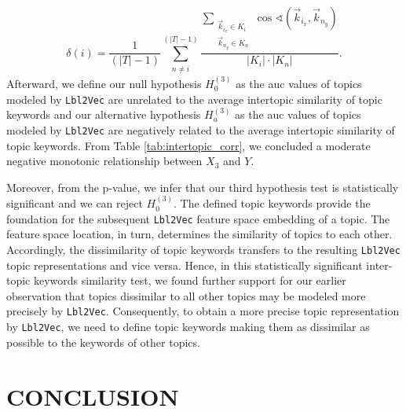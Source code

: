 \documentclass[a4paper,twoside]{article}
\begin{document}
\begin{equation}
    \delta(i)=\frac{1}{(|T|-1)}\sum_{\substack{n\neq i}}^{(|T|-1)} \frac{\sum\limits_{\substack{\vec{k}_{{i}_x}\in K_{i} \\ \vec{k}_{n_{y}}\in K_{n}}}\cos\sphericalangle(\vec{k}_{{i}_x},\vec{k}_{{n}_y})}{|K_{i}|\cdot|K_{n}|}.
\end{equation}
Afterward, we define our null hypothesis $H_{0}^{(3)}$ as the \ac{auc} values of topics modeled by \texttt{Lbl2Vec} are unrelated to the average intertopic similarity of topic keywords and our alternative hypothesis $H_{a}^{(3)}$ as the \ac{auc} values of topics modeled by \texttt{Lbl2Vec} are negatively related to the average intertopic similarity of topic keywords. From Table \ref{tab:intertopic_corr}, we concluded a moderate negative monotonic relationship between ${X_3}$ and $Y$.
\begin{table}[ht]
\centering
{}\caption{\label{tab:intertopic_corr} Correlation values that measure the relationship between ${X_3=}$ average intertopic similarity of topic keywords and ${Y=\textrm{\ac{auc}}}$ value of a topic. $X_{3_{min}}=0.07$ and $X_{3_{max}}=0.11$.}
\end{table}
Moreover, from the p-value, we infer that our third hypothesis test is statistically significant and we can reject $H_{0}^{(3)}$. The defined topic keywords provide the foundation for the subsequent \texttt{Lbl2Vec} feature space embedding of a topic. The feature space location, in turn, determines the similarity of topics to each other. Accordingly, the dissimilarity of topic keywords transfers to the resulting \texttt{Lbl2Vec} topic representations and vice versa. Hence, in this statistically significant inter-topic keywords similarity test, we found further support for our earlier observation that topics dissimilar to all other topics may be modeled more precisely by \texttt{Lbl2Vec}. Consequently, to obtain a more precise topic representation by \texttt{Lbl2Vec}, we need to define topic keywords making them as dissimilar as possible to the keywords of other topics. \newline

\section{\uppercase{Conclusion}}
\label{sec:conclusion}
\end{document}
